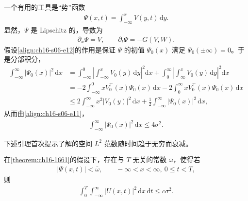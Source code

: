 \documentclass[../../main.tex]{subfiles}
\begin{document}
一个有用的工具是“势”函数
\begin{align}
\Psi(x,t)=\int_{-\infty}^x V(y,t)\,\mathrm{d}y.
\label{align:ch16-s06-e15}
\end{align}
显然，$\Psi$ 是 Lipschitz 的，导数为
\begin{align}
\partial_x\Psi=V,\qquad\partial_t\Psi=-G(V,W).
\label{align:ch16-s06-e16}
\end{align}
假设\eqref{align:ch16-s06-e12}的作用是保证 $\Psi$ 的初值 $\Psi_0(x)$ 满足 $\Psi_0(\pm\infty)=0$。于是分部积分，
\begin{align}
\int_{-\infty}^{\infty}|\Psi_0(x)|^2\,\mathrm{d}x&=\int_{-\infty}^0\left|\int_{-\infty}^x V_0(y)\,\mathrm{d}y\right|^2\mathrm{d}x+\int_0^\infty\left|\int_\infty^x V_0(y)\,\mathrm{d}y\right|^2\mathrm{d}x\nonumber\\
&=-2\int_{-\infty}^0 xV_0^\top(x)\Psi_0(x)\,\mathrm{d}x-2\int_0^\infty xV_0^\top(x)\Psi_0(x)\,\mathrm{d}x\nonumber\\
&\leqslant2\int_{-\infty}^\infty x^2|V_0(y)|^2\,\mathrm{d}x+\frac12\int_{-\infty}^\infty|\Psi_0(x)|^2\,\mathrm{d}x,
\label{align:ch16-s06-e17}
\end{align}
从而由\eqref{align:ch16-s06-e11}，
\begin{align}
\int_{-\infty}^{\infty}|\Psi_0(x)|^2\,\mathrm{d}x\leqslant4\sigma^2.
\label{align:ch16-s06-e18}
\end{align}

下述引理首次提示了解的空间 $L^2$ 范数随时间趋于无穷而衰减。

\begin{lemma}\label{lemma:ch16-1662}
在\cref{theorem:ch16-1661}的假设下，存在与 $T$ 无关的常数 $\bar\omega$，使得若
\begin{align}
|\Psi(x,t)|<\bar\omega,\qquad-\infty<x<\infty,\ 0\leqslant t<T,
\label{align:ch16-s06-e19}
\end{align}
则
\begin{align}
\int_0^T\int_{-\infty}^{\infty}|U(x,t)|^2\,\mathrm{d}x\,\mathrm{d}t\leqslant c\sigma^2.
\label{align:ch16-s06-e020}
\end{align}
\end{lemma}
\end{document}
